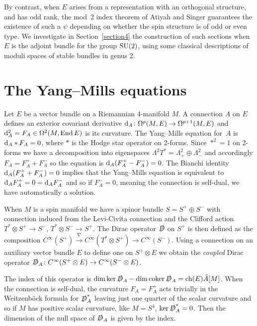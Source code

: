 \documentclass[pdftex]{sigma}
\def\End{\operatorname{End}}
\def\coker{\operatorname{coker}}
\begin{document}
By contrast, when $E$ arises from a representation with an orthogonal structure, and has odd rank, the mod~2 index theorem of Atiyah and Singer guarantees the existence of such a $\psi$ depending on whether the spin structure is of odd or even type. We investigate in Section~\ref{section4} the construction of such sections when~$E$ is the adjoint bundle for the group ${\rm SU}(2)$, using some classical descriptions of moduli spaces of stable bundles in genus 2.

\section{The Yang--Mills equations}\label{section2}
Let $E$ be a vector bundle on a Riemannian 4-manifold $M$. A connection $A$ on $E$ defines an exterior covariant derivative ${\rm d}_A\colon \Omega^p(M, E)\rightarrow \Omega^{p+1}(M, E)$ and ${\rm d}_A^2=F_A\in \Omega^2(M,\End E)$ is its curvature. The Yang--Mills equation for~$A$ is ${\rm d}_A\ast F_A=0$, where $\ast$ is the Hodge star operator on 2-forms. Since $\ast^2=1$ on 2-forms we have a decomposition into eigenspaces $\Lambda^2T^*=\Lambda^2_+\oplus \Lambda^2_-$ and accordingly $F_A=F_A^++ F_A^-$ so the equation is ${\rm d}_A(F_A^+- F_A^-)=0$. The Bianchi identity ${\rm d}_A(F_A^++F_A^-)=0$ implies that the Yang--Mills equation is equivalent to ${\rm d}_AF_A^+=0={\rm d}_AF_A^-$ and so if $F_A^-=0$, meaning the connection is self-dual, we have automatically a solution.

When $M$ is a spin manifold we have a spinor bundle $S=S^+\oplus S^-$ with connection induced from the Levi-Civita connection and the Clifford action $T^*\otimes S^+\rightarrow S^-$, $T^*\otimes S^-\rightarrow S^+$. The Dirac operator $\slashed D$ on $S^+$ is then defined as the composition $C^{\infty}(S^+)\stackrel{\nabla}\rightarrow C^{\infty}(T^*\otimes S^+)\rightarrow C^{\infty}(S^-)$. Using a connection on an auxiliary vector bundle $E$ to define one on $ S^+\otimes E$ we obtain the {\it coupled} Dirac operator $\slashed D_A\colon C^{\infty}(S^+\otimes E)\rightarrow
C^{\infty}(S^-\otimes E)$.

The index of this operator is $\dim \ker \slashed D_A-\dim \coker \slashed D_A=\mathrm{ch}(E)\hat A[M]$. When the connection is self-dual, the curvature $F_A=F_A^+$ acts trivially in the Weitzenb\"ock formula for $\slashed D_A^*$ leaving just one quarter of the scalar curvature and so if $M$ has positive scalar curvature, like $M=S^4$, $\ker \slashed D_A^*=0$. Then the dimension of the null space of $\slashed D_A$ is given by the index.
\end{document}
